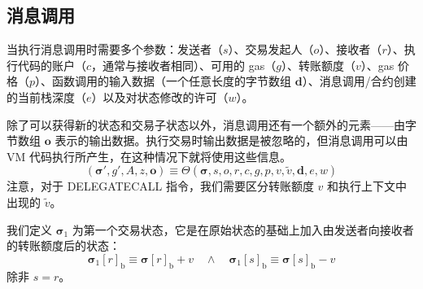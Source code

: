 \documentclass[9pt,oneside]{amsart}
\begin{document}
\begin{multicols}{2}
\section{消息调用} \label{ch:call}
当执行消息调用时需要多个参数：发送者（$s$）、交易发起人（$o$）、接收者（$r$）、执行代码的账户（$c$，通常与接收者相同）、可用的 gas（$g$）、转账额度（$v$）、gas 价格（$p$）、函数调用的输入数据（一个任意长度的字节数组 $\mathbf{d}$）、消息调用/合约创建的当前栈深度（$e$）以及对状态修改的许可（$w$）。

除了可以获得新的状态和交易子状态以外，消息调用还有一个额外的元素——由字节数组 $\mathbf{o}$ 表示的输出数据。执行交易时输出数据是被忽略的，但消息调用可以由 VM 代码执行所产生，在这种情况下就将使用这些信息。
\begin{equation}
(\boldsymbol{\sigma}', g', A, z, \mathbf{o}) \equiv \Theta(\boldsymbol{\sigma}, s, o, r, c, g, p, v, \tilde{v}, \mathbf{d}, e, w)
\end{equation}
注意，对于 {\small DELEGATECALL} 指令，我们需要区分转账额度 $v$ 和执行上下文中出现的 $\tilde{v}$。

我们定义 $\boldsymbol{\sigma}_1$ 为第一个交易状态，它是在原始状态的基础上加入由发送者向接收者的转账额度后的状态：
\begin{equation}
\boldsymbol{\sigma}_1[r]_{\mathrm{b}} \equiv \boldsymbol{\sigma}[r]_{\mathrm{b}} + v \quad\wedge\quad \boldsymbol{\sigma}_1[s]_{\mathrm{b}} \equiv \boldsymbol{\sigma}[s]_{\mathrm{b}} - v
\end{equation}
除非 $s = r$。


\end{multicols}
\end{document}
